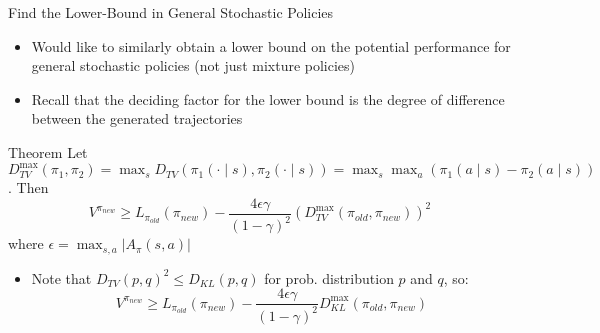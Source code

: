 \documentclass[aspectratio=169]{../latex_main/tntbeamer}  %
\begin{document}
\begin{frame}[c]{Find the Lower-Bound in General Stochastic Policies}
	
	 \vspace{-1.5em}
    \begin{itemize}
        \item Would like to similarly obtain a lower bound on the potential performance for general stochastic policies (not just mixture policies)
        \item Recall that the deciding factor for the lower bound is the degree of difference between the generated trajectories
    \end{itemize}
    
    \begin{block}{Theorem}
    Let $D_{TV}^{\max} (\pi_1, \pi_2) = \max_{s} D_{TV}(\pi_1(\cdot \mid s), \pi_2(\cdot\mid s)) = \max_{s} \max_{a} (\pi_1(a\mid s) -\pi_2 (a\mid s))$. Then
    $$V^{\pi_{new}} \geq L_{\pi_{old}} (\pi_{new}) - \frac{4\epsilon\gamma}{(1-\gamma)^2} (D_{TV}^{\max}(\pi_{old}, \pi_{new}))^2$$
    \vspace{-0.3em}
    where $\epsilon = \max_{s,a}|A_\pi(s,a)|$
    \end{block}
    
    \begin{itemize}
        \item Note that $D_{TV}(p,q)^2 \leq D_{KL}(p,q)$ for prob. distribution $p$ and $q$, so:
        $$ V^{\pi_{new}} \geq  L_{\pi_{old}} (\pi_{new}) -  \frac{4\epsilon\gamma}{(1-\gamma)^2} D_{KL}^{\max}(\pi_{old}, \pi_{new}) $$
    \end{itemize}

\end{frame}
\end{document}
